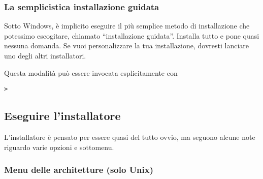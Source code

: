 \documentclass{article}
\begin{document}
\subsubsection{La semplicistica installazione guidata}

Sotto Windows, è implicito eseguire il più semplice metodo di
installazione che potessimo escogitare, chiamato ``installazione
guidata''. Installa tutto e pone quasi nessuna domanda. Se vuoi
personalizzare la tua installazione, dovresti lanciare uno degli altri
installatori.

Questa modalità può essere invocata esplicitamente con
\begin{alltt}
> 
\end{alltt}


\subsection{Eseguire l'installatore}
\label{sec:runinstall}

L'installatore è pensato per essere quasi del tutto ovvio, ma seguono
alcune note riguardo varie opzioni e sottomenu.

\subsubsection{Menu delle architetture (solo Unix)}
\label{sec:binary}
\end{document}
